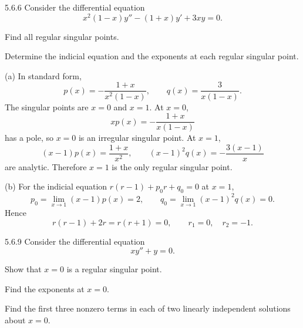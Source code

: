 \documentclass[11pt,oneside]{article}
\begin{document}
\begin{problem}{5.6.6}
Consider the differential equation
\[
    x^2(1-x)y''-(1+x)y'+3xy=0.
\]
\begin{problemsubparts}
    \item Find all regular singular points.
    \item Determine the indicial equation and the exponents at each regular singular point.
\end{problemsubparts}
\end{problem}

\begin{solution}
\noindent\textup{(a)} In standard form,
\[
    p(x)=-\frac{1+x}{x^2(1-x)}, \qquad
    q(x)=\frac{3}{x(1-x)}.
\]
The singular points are $x=0$ and $x=1$. At $x=0$,
\[
    xp(x)=-\frac{1+x}{x(1-x)}
\]
has a pole, so $x=0$ is an irregular singular point. At $x=1$,
\[
    (x-1)p(x)=\frac{1+x}{x^2}, \qquad
    (x-1)^2q(x)=-\frac{3(x-1)}{x}
\]
are analytic. Therefore $x=1$ is the only regular singular point.

\noindent\textup{(b)} For the indicial equation $r(r-1)+p_0r+q_0=0$ at $x=1$,
\[
    p_0=\lim_{x\to1}(x-1)p(x)=2, \qquad
    q_0=\lim_{x\to1}(x-1)^2q(x)=0.
\]
Hence
\[
    \boxed{r(r-1)+2r=r(r+1)=0},
    \qquad \boxed{r_1=0, \quad r_2=-1}.
\]
\end{solution}

\begin{problem}{5.6.9}
Consider the differential equation
\[
    xy''+y=0.
\]
\begin{problemsubparts}
    \item Show that $x=0$ is a regular singular point.
    \item Find the exponents at $x=0$.
    \item Find the first three nonzero terms in each of two linearly independent solutions about $x=0$.
\end{problemsubparts}
\end{problem}
\end{document}
